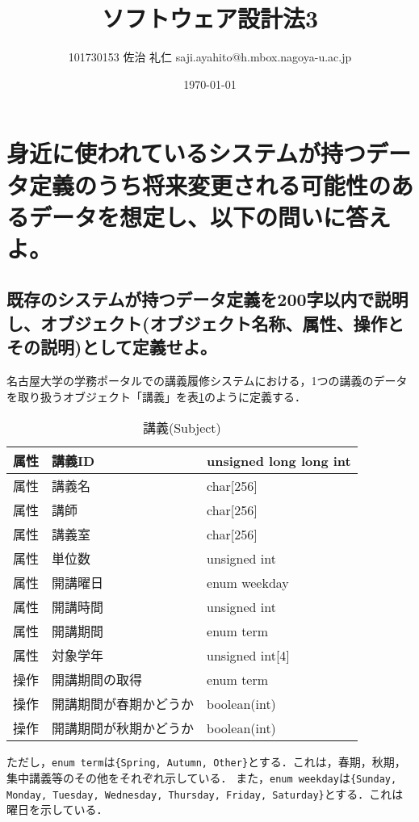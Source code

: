 \documentclass[uplatex]{jsarticle}
\title{ソフトウェア設計法3}
\author{101730153 佐治 礼仁 saji.ayahito@h.mbox.nagoya-u.ac.jp}
\date{\today}
\begin{document}
\maketitle
\section{身近に使われているシステムが持つデータ定義のうち将来変更される可能性のあるデータを想定し、以下の問いに答えよ。}
\subsection{既存のシステムが持つデータ定義を200字以内で説明し、オブジェクト(オブジェクト名称、属性、操作とその説明)として定義せよ。}
名古屋大学の学務ポータルでの講義履修システムにおける，1つの講義のデータを取り扱うオブジェクト「講義」を表\ref{tbl:subject}のように定義する．
\begin{table}[tb]
  \begin{center}
    \caption{講義(Subject)}
    \begin{tabular}{|l|l|l|} \hline
      属性 & 講義ID & unsigned long long int \\ \hline
      属性 & 講義名 & char[256] \\ \hline
      属性 & 講師 & char[256] \\ \hline
      属性 & 講義室 & char[256] \\ \hline
      属性 & 単位数 & unsigned int \\ \hline
      属性 & 開講曜日 & enum weekday \\ \hline
      属性 & 開講時間 & unsigned int \\ \hline
      属性 & 開講期間 & enum term \\ \hline
      属性 & 対象学年 & unsigned int[4] \\ \hline
      操作 & 開講期間の取得 & enum term \\ \hline
      操作 & 開講期間が春期かどうか & boolean(int) \\ \hline
      操作 & 開講期間が秋期かどうか & boolean(int) \\ \hline
    \end{tabular}
    \label{tbl:subject}
  \end{center}
\end{table}
ただし，\verb#enum term#は\verb#{Spring, Autumn, Other}#とする．これは，春期，秋期，集中講義等のその他をそれぞれ示している．
また，\verb#enum weekday#は\verb#{Sunday, Monday, Tuesday, Wednesday, Thursday, Friday, Saturday}#とする．これは曜日を示している．
\end{document}
